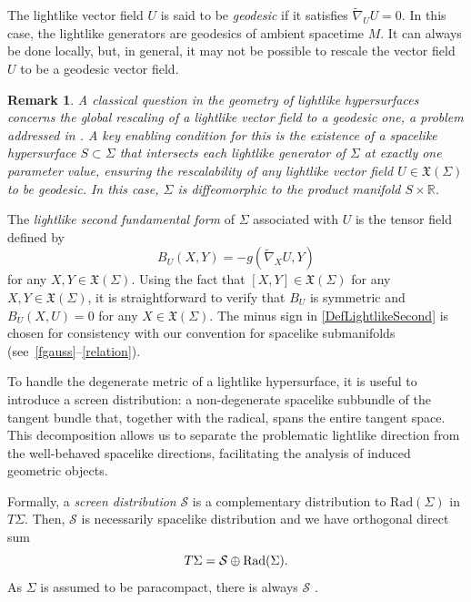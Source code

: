 \documentclass[11pt]{article}
\numberwithin{equation}{section}
\newtheorem{remark}[theorem]{Remark}
\begin{document}
	The lightlike vector field $U$ is said to be \emph{geodesic} if it satisfies $\widetilde{\nabla}_{U} U = 0$. In this case, the lightlike generators are geodesics of ambient spacetime $M$. It can always be done locally, but, in general, it may not be possible to rescale the vector field $U$ to be a geodesic vector field. 
	
	
	
	\begin{remark}\normalfont \label{remark:causally_separated}
		A classical question in the geometry of lightlike hypersurfaces concerns the global rescaling of a lightlike vector field to a geodesic one, a problem addressed in \cite[Sec.~4]{kupeli87}. A key enabling condition for this is the existence of a spacelike hypersurface $S \subset \Sigma$ that intersects each lightlike generator of $\Sigma$ at exactly one parameter value, ensuring the rescalability of any lightlike vector field $U \in \mathfrak{X}(\Sigma)$ to be geodesic. In this case, $\Sigma$ is diffeomorphic to the product manifold $S \times \mathbb{R}$.
	\end{remark}
	
	
	The \emph{lightlike second
		fundamental form} of $\Sigma$ associated with $U$ is the tensor field defined by \cite{Bejancu1996} 
	\begin{equation}\label{DefLightlikeSecond}
		B_U(X,Y)=-g(\widetilde{\nabla}_XU,Y)
	\end{equation}
	for any $X,Y \in {\mathfrak X}(\Sigma)$. Using the fact that $[X,Y] \in {\mathfrak X}(\Sigma)$ for any $X,Y \in {\mathfrak X}(\Sigma)$, it is straightforward to verify that $B_U$ is symmetric and $B_U(X,U) = 0$ for any $X \in {\mathfrak X}(\Sigma)$. The minus sign in \eqref{DefLightlikeSecond} is chosen for consistency with our convention for spacelike submanifolds (see~\eqref{fgauss}--\eqref{relation}).
	
	To  handle the degenerate metric of a lightlike hypersurface, it is useful to introduce a screen distribution: a non-degenerate spacelike subbundle of the tangent bundle that, together with the radical, spans the entire tangent space. This decomposition allows us to separate the problematic lightlike direction from the well-behaved spacelike directions, facilitating the analysis of induced geometric objects.
	
	Formally, a \emph{screen distribution} $\mathcal{S}$ is a complementary distribution to $\mathrm {Rad}(\Sigma)$ in $T\Sigma$. Then, $\mathcal{S}$ is necessarily spacelike distribution and we have orthogonal direct sum 
	\begin{equation}\label{DesRad}
		T\Sigma= \mathcal{S}\oplus {\rm Rad}(\Sigma).
	\end{equation}
	As $\Sigma$ is assumed to be paracompact, there is always ${\mathcal S}$ \cite{Duggal_Sahin}. 
	
\end{document}

